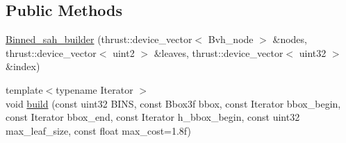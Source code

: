\subsection*{Public Methods}
\begin{DoxyCompactItemize}
\item 
\hyperlink{structnih_1_1cuda_1_1_binned__sah__builder_aa63d7a78d801ae4bf48f61cc84733de8}{Binned\+\_\+sah\+\_\+builder} (thrust\+::device\+\_\+vector$<$ Bvh\+\_\+node $>$ \&nodes, thrust\+::device\+\_\+vector$<$ uint2 $>$ \&leaves, thrust\+::device\+\_\+vector$<$ uint32 $>$ \&index)
\item 
{\footnotesize template$<$typename Iterator $>$ }\\void \hyperlink{structnih_1_1cuda_1_1_binned__sah__builder_a7ca217a25c11788754ccdccfef056e65}{build} (const uint32 B\+I\+NS, const Bbox3f bbox, const Iterator bbox\+\_\+begin, const Iterator bbox\+\_\+end, const Iterator h\+\_\+bbox\+\_\+begin, const uint32 max\+\_\+leaf\+\_\+size, const float max\+\_\+cost=1.\+8f)
\end{DoxyCompactItemize}
